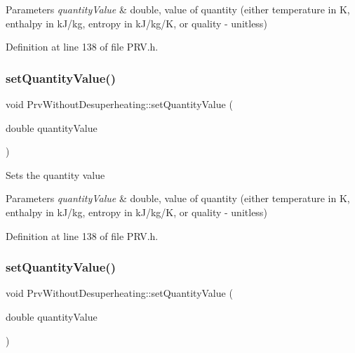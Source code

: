 \begin{DoxyParams}{Parameters}
{\em quantity\+Value} & double, value of quantity (either temperature in K, enthalpy in k\+J/kg, entropy in k\+J/kg/K, or quality -\/ unitless) \\
\hline
\end{DoxyParams}


Definition at line 138 of file P\+R\+V.\+h.

\mbox{\label{class_prv_without_desuperheating_a5ed2d0f0f558705d482ed0502131757f}} 
\subsubsection{\texorpdfstring{set\+Quantity\+Value()}{setQuantityValue()}\hspace{0.1cm}{\footnotesize\ttfamily [2/3]}}
{\footnotesize\ttfamily void Prv\+Without\+Desuperheating\+::set\+Quantity\+Value (\begin{DoxyParamCaption}\item[{double}]{quantity\+Value }\end{DoxyParamCaption})\hspace{0.3cm}{\ttfamily [inline]}}

Sets the quantity value


\begin{DoxyParams}{Parameters}
{\em quantity\+Value} & double, value of quantity (either temperature in K, enthalpy in k\+J/kg, entropy in k\+J/kg/K, or quality -\/ unitless) \\
\hline
\end{DoxyParams}


Definition at line 138 of file P\+R\+V.\+h.

\mbox{\label{class_prv_without_desuperheating_a5ed2d0f0f558705d482ed0502131757f}} 
\subsubsection{\texorpdfstring{set\+Quantity\+Value()}{setQuantityValue()}\hspace{0.1cm}{\footnotesize\ttfamily [3/3]}}
{\footnotesize\ttfamily void Prv\+Without\+Desuperheating\+::set\+Quantity\+Value (\begin{DoxyParamCaption}\item[{double}]{quantity\+Value }\end{DoxyParamCaption})\hspace{0.3cm}{\ttfamily [inline]}}

